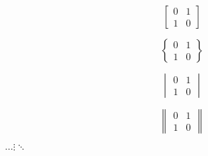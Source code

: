 \documentclass[]{ctexart}
\begin{document}
	\[
		\begin{bmatrix}
			0 & 1 \\
			1 & 0
		\end{bmatrix}
	\]
	
	\[
		\begin{Bmatrix}
			0 & 1 \\
			1 & 0
		\end{Bmatrix}
	\]
	
	\[
		\begin{vmatrix}
			0 & 1 \\
			1 & 0
		\end{vmatrix}
	\]
	
	\[
		\begin{Vmatrix}
			0 & 1 \\
			1 & 0
		\end{Vmatrix}
	\]
	
 	\(	\dots  \vdots  \ddots \)
 	
 	
 
\end{document}
